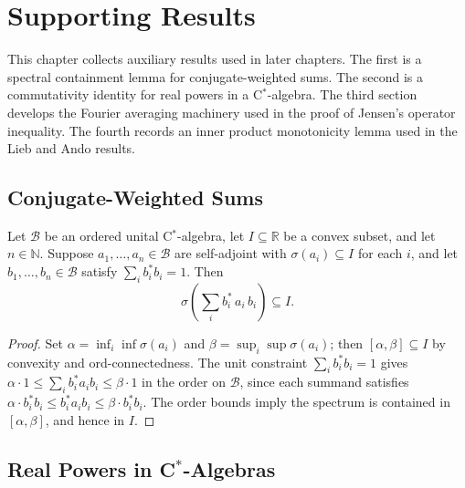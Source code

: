 \chapter{Supporting Results}

This chapter collects auxiliary results used in later chapters.
The first is a spectral containment lemma for conjugate-weighted sums.
The second is a commutativity identity for real powers in a C$^*$-algebra.
The third section develops the Fourier averaging machinery used in the proof
of Jensen's operator inequality.
The fourth records an inner product monotonicity lemma used in the Lieb and Ando results.

\section{Conjugate-Weighted Sums}

\begin{lemma}
  \label{lem:conj_sum_spectrum}
  \leanok
  Let $\mathcal{B}$ be an ordered unital C$^*$-algebra, let $I \subseteq \mathbb{R}$
  be a convex subset, and let $n \in \mathbb{N}$.  Suppose
  $a_1, \dots, a_n \in \mathcal{B}$ are self-adjoint with $\sigma(a_i) \subseteq I$
  for each $i$, and let $b_1, \dots, b_n \in \mathcal{B}$ satisfy
  $\sum_i b_i^* b_i = 1$.  Then
  \[
    \sigma\!\left(\sum_i b_i^*\, a_i\, b_i\right) \subseteq I.
  \]
  \begin{proof}
    \leanok
    Set $\alpha = \inf_i \inf \sigma(a_i)$ and $\beta = \sup_i \sup \sigma(a_i)$;
    then $[\alpha, \beta] \subseteq I$ by convexity and ord-connectedness.
    The unit constraint $\sum_i b_i^* b_i = 1$ gives
    $\alpha \cdot 1 \leq \sum_i b_i^* a_i b_i \leq \beta \cdot 1$
    in the order on $\mathcal{B}$, since each summand satisfies
    $\alpha \cdot b_i^* b_i \leq b_i^* a_i b_i \leq \beta \cdot b_i^* b_i$.
    The order bounds imply the spectrum is contained in $[\alpha, \beta]$,
    and hence in $I$.
  \end{proof}
\end{lemma}

\section{Real Powers in C\texorpdfstring{$^*$}{*}-Algebras}


